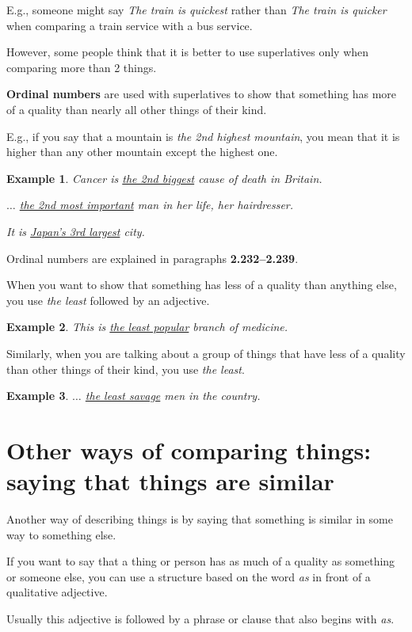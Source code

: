 \documentclass[oneside]{book}
\numberwithin{equation}{section}
\newtheorem{example}{Example}[section]
\begin{document}
E.g., someone might say \textit{The train is quickest} rather than \textit{The train is quicker} when comparing a train service with a bus service.

However, some people think that it is better to use superlatives only when comparing more than 2 things.

%
\noindent{} \textbf{Ordinal numbers} are used with superlatives to show that something has more of a quality than nearly all other things of their kind.

E.g., if you say that a mountain is \textit{the 2nd highest mountain}, you mean that it is higher than any other mountain except the highest one.
\begin{example}
    Cancer is \underline{the 2nd biggest} cause of death in Britain.
    
    $\ldots$ \underline{the 2nd most important} man in her life, her hairdresser.
    
    It is \underline{Japan's 3rd largest} city.
\end{example}
Ordinal numbers are explained in paragraphs \textbf{2.232--2.239}.

%
\noindent{} When you want to show that something has less of a quality than anything else, you use \textit{the least} followed by an adjective.
\begin{example}
    This is \underline{the least popular} branch of medicine.
\end{example}
Similarly, when you are talking about a group of things that have less of a quality than other things of their kind, you use \textit{the least}.
\begin{example}
    $\ldots$ \underline{the least savage} men in the country.
\end{example}

\section{Other ways of comparing things: saying that things are similar}
\noindent{} Another way of describing things is by saying that something is similar in some way to something else.

%
\noindent{} If you want to say that a thing or person has as much of a quality as something or someone else, you can use a structure based on the word \textit{as} in front of a qualitative adjective.

Usually this adjective is followed by a phrase or clause that also begins with \textit{as}.
\end{document}
